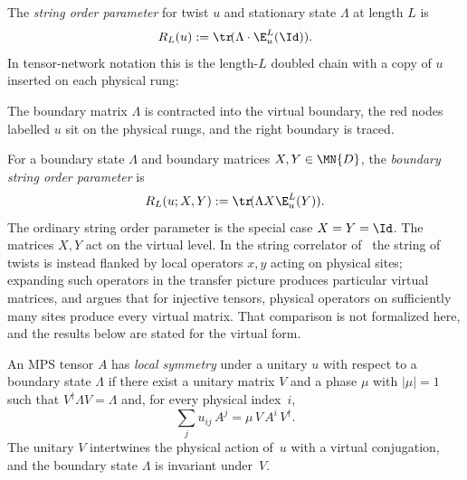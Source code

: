 \begin{definition}\label{def:string_order_param}
    \leanok
    The \emph{string order parameter} for twist $u$ and stationary
    state $\Lambda$ at length $L$ is
    \[
        R_L(u) :=  \tr\!(\Lambda \cdot \E_u^L(\Id)).
    \]
    In tensor-network notation this is the length-$L$ doubled chain with a
    copy of $u$ inserted on each physical rung:
    \begin{center}
    \end{center}
    The boundary matrix $\Lambda$ is contracted into the virtual boundary, the
    red nodes labelled $u$ sit on the physical rungs, and the right boundary
    is traced.
\end{definition}

\begin{definition}%
    \label{def:string_order_boundary_param}
    \leanok
    For a boundary state $\Lambda$ and boundary matrices $X,Y \in \MN{D}$, the
    \emph{boundary string order parameter} is
    \[
        R_L(u;X,Y) := \tr\!(\Lambda X \E_u^L(Y)).
    \]
    The ordinary string order parameter is the special case $X=Y=\Id$.
    The matrices $X,Y$ act on the virtual level. In the string correlator
    of~\cite{PerezGarcia2008StringOrder} the string of twists is instead
    flanked by local operators $x,y$ acting on physical sites; expanding
    such operators in the transfer picture produces particular virtual
    matrices, and \cite{PerezGarcia2008StringOrder} argues that for
    injective tensors, physical operators on sufficiently many sites
    produce every virtual matrix. That comparison is not formalized here,
    and the results below are stated for the virtual form.
\end{definition}

\begin{definition}\label{def:local_symmetry}
    \leanok
    An MPS tensor $A$ has \emph{local symmetry} under a unitary $u$ with
    respect to a boundary state $\Lambda$ if there exist a unitary
    matrix $V$ and a phase $\mu$ with $|\mu| = 1$ such that
    $V^\dagger \Lambda V = \Lambda$ and, for every physical index~$i$,
    \[
        \sum_j u_{ij}\, A^j = \mu\, V\, A^i\, V^\dagger.
    \]
    The unitary $V$ intertwines the physical action of~$u$ with a virtual
    conjugation, and the boundary state $\Lambda$ is invariant under~$V$.
\end{definition}

